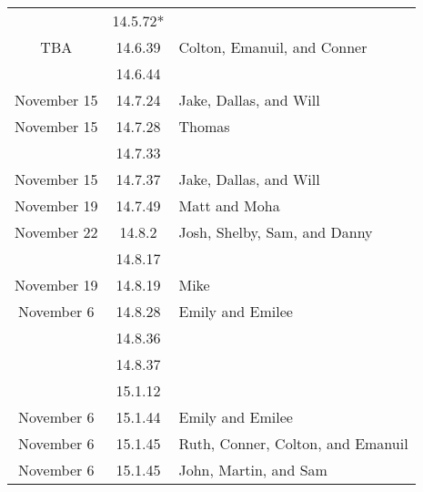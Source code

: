 \documentclass[12pt]{amsart}
\begin{document}
\begin{longtable}{c|c|l}
                        & 14.5.72*                             &                                          \\
        TBA             & 14.6.39                              & Colton, Emanuil, and Conner              \\
                        & 14.6.44                              &                                          \\
        November 15     & 14.7.24                              & Jake, Dallas, and Will                   \\
        November 15     & 14.7.28                              & Thomas                                   \\
                        & 14.7.33                              &                                          \\
        November 15     & 14.7.37                              & Jake, Dallas, and Will                   \\
        November 19     & 14.7.49                              & Matt and Moha                            \\
        November 22     & 14.8.2                               & Josh, Shelby, Sam, and Danny             \\
                        & 14.8.17                              &                                          \\
        November 19     & 14.8.19                              & Mike                                     \\
        November 6      & 14.8.28                              & Emily and Emilee                         \\
                        & 14.8.36                              &                                          \\
                        & 14.8.37                              &                                          \\
                        & 15.1.12                              &                                          \\
        November 6      & 15.1.44                              & Emily and Emilee                         \\
        November 6      & 15.1.45                              & Ruth, Conner, Colton, and Emanuil        \\
        November 6      & 15.1.45                              & John, Martin, and Sam                    \\

\end{longtable}
\end{document}
